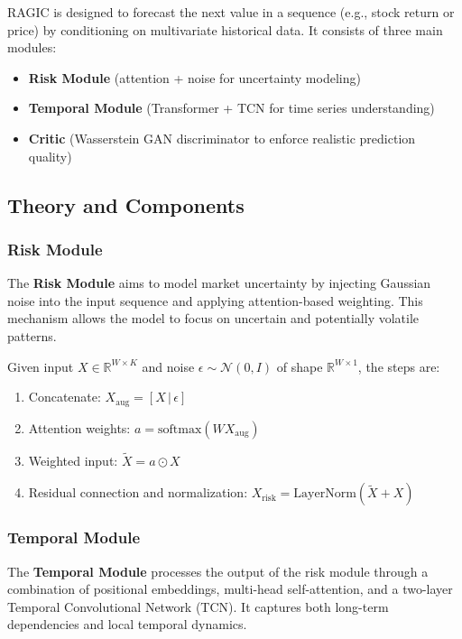 RAGIC is designed to forecast the next value in a sequence (e.g., stock return or price) by conditioning on multivariate historical data. It consists of three main modules:
\begin{itemize}
    \item \textbf{Risk Module} (attention + noise for uncertainty modeling)
    \item \textbf{Temporal Module} (Transformer + TCN for time series understanding)
    \item \textbf{Critic} (Wasserstein GAN discriminator to enforce realistic prediction quality)
\end{itemize}

\subsection{Theory and Components}

\subsubsection{Risk Module}

The \textbf{Risk Module} aims to model market uncertainty by injecting Gaussian noise into the input sequence and applying attention-based weighting. This mechanism allows the model to focus on uncertain and potentially volatile patterns.

Given input $X \in \mathbb{R}^{W \times K}$ and noise $\epsilon \sim \mathcal{N}(0, I)$ of shape $\mathbb{R}^{W \times 1}$, the steps are:
\begin{enumerate}
    \item Concatenate: $X_{\text{aug}} = [X \, | \, \epsilon]$
    \item Attention weights: $a = \text{softmax}(WX_{\text{aug}})$
    \item Weighted input: $\tilde{X} = a \odot X$
    \item Residual connection and normalization: $X_{\text{risk}} = \text{LayerNorm}(\tilde{X} + X)$
\end{enumerate}

\subsubsection{Temporal Module}

The \textbf{Temporal Module} processes the output of the risk module through a combination of positional embeddings, multi-head self-attention, and a two-layer Temporal Convolutional Network (TCN). It captures both long-term dependencies and local temporal dynamics.

